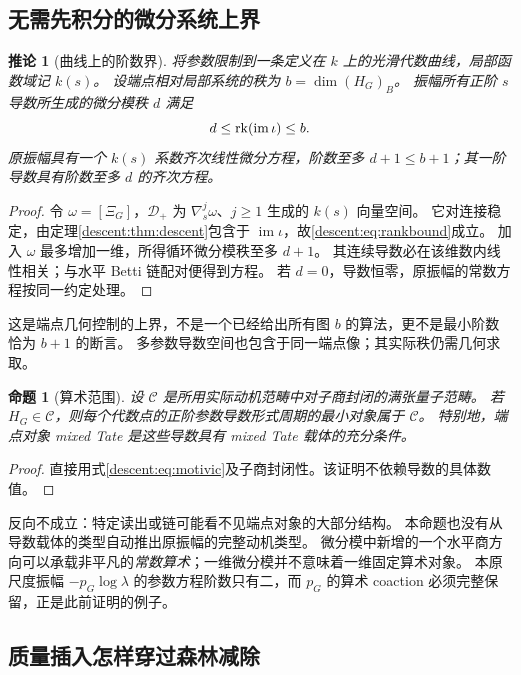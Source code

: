 \documentclass[11pt,a4paper,oneside]{ctexart}
\theoremstyle{cnplain}
\newtheorem{proposition}[theorem]{命题}
\newtheorem{corollary}[theorem]{推论}
\theoremstyle{definition}
\theoremstyle{remark}
\newcommand{\im}{\operatorname{im}}
\numberwithin{equation}{section}
\begin{document}
\subsection{无需先积分的微分系统上界}
\begin{corollary}[曲线上的阶数界]\label{descent:cor:ode}
将参数限制到一条定义在 $k$ 上的光滑代数曲线，局部函数域记 $k(s)$。
设端点相对局部系统的秩为 $b=\dim(H_G)_B$。
振幅所有正阶 $s$ 导数所生成的微分模秩 $d$ 满足
\begin{equation}\label{descent:eq:rankbound}
 d\leq\rk(\im\iota)\leq b.
\end{equation}
原振幅具有一个 $k(s)$ 系数齐次线性微分方程，阶数至多 $d+1\leq b+1$；其一阶导数具有阶数至多 $d$ 的齐次方程。
\end{corollary}
\begin{proof}
令 $\omega=[\Xi_G]$，$\mathcal D_+$ 为 $\nabla_s^j\omega$、$j\geq1$ 生成的 $k(s)$ 向量空间。
它对连接稳定，由定理\ref{descent:thm:descent}包含于 $\im\iota$，故\eqref{descent:eq:rankbound}成立。
加入 $\omega$ 最多增加一维，所得循环微分模秩至多 $d+1$。
其连续导数必在该维数内线性相关；与水平 Betti 链配对便得到方程。
若 $d=0$，导数恒零，原振幅的常数方程按同一约定处理。
\end{proof}

这是端点几何控制的上界，不是一个已经给出所有图 $b$ 的算法，更不是最小阶数恰为 $b+1$ 的断言。
多参数导数空间也包含于同一端点像；其实际秩仍需几何求取。

\begin{proposition}[算术范围]\label{descent:prop:arithmetic}
设 $\mathcal C$ 是所用实际动机范畴中对子商封闭的满张量子范畴。
若 $H_G\in\mathcal C$，则每个代数点的正阶参数导数形式周期的最小对象属于 $\mathcal C$。
特别地，端点对象 mixed Tate 是这些导数具有 mixed Tate 载体的充分条件。
\end{proposition}
\begin{proof}
直接用式\eqref{descent:eq:motivic}及子商封闭性。该证明不依赖导数的具体数值。
\end{proof}

反向不成立：特定读出或链可能看不见端点对象的大部分结构。
本命题也没有从导数载体的类型自动推出原振幅的完整动机类型。
微分模中新增的一个水平商方向可以承载非平凡的\emph{常数算术}；一维微分模并不意味着一维固定算术对象。
本原尺度振幅 $-p_G\log\lambda$ 的参数方程阶数只有二，而 $p_G$ 的算术 coaction 必须完整保留，正是此前证明的例子。


\subsection{质量插入怎样穿过森林减除}
\end{document}
